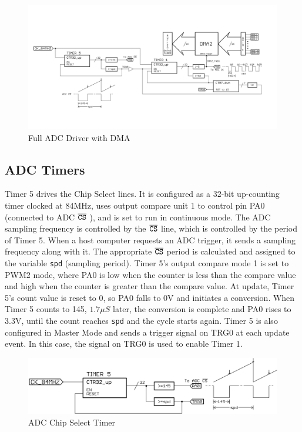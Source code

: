 \begin{figure}[H]
  \begin{center}
      \includegraphics[width=1\textwidth]{../ADC.png}
      \caption{Full ADC Driver with DMA}
  \end{center}
\end{figure}


\subsection{ADC Timers}

Timer 5 drives the Chip Select lines.
It is configured as a 32-bit up-counting timer clocked at 84MHz, uses output compare unit 1 to control pin PA0 (connected to ADC $\overline{\mbox{\texttt{CS}}}$ ), and is set to run in continuous mode.
The ADC sampling frequency is controlled by the $\overline{\mbox{\texttt{CS}}}$ line, which is controlled by the period of Timer 5.
When a host computer requests an ADC trigger, it sends a sampling frequency along with it.
The appropriate $\overline{\mbox{\texttt{CS}}}$ period is calculated and assigned to the variable \texttt{spd} (sampling period).
Timer 5's output compare mode 1 is set to PWM2 mode, where PA0 is low when the counter is less than the compare value and high when the counter is greater than the compare value.
At update, Timer 5's count value is reset to 0, so PA0 falls to 0V and initiates a conversion.
When Timer 5 counts to 145, $1.7\mu S$ later, the conversion is complete and PA0 rises to 3.3V, until the count reaches \texttt{spd} and the cycle starts again.
Timer 5 is also configured in Master Mode and sends a trigger signal on TRG0 at each update event.
In this case, the signal on TRG0 is used to enable Timer 1.

\begin{figure}[H]
  \begin{center}
      \includegraphics[width=1\textwidth]{../tim5.png}
      \caption{ADC Chip Select Timer}
  \end{center}
\end{figure}

